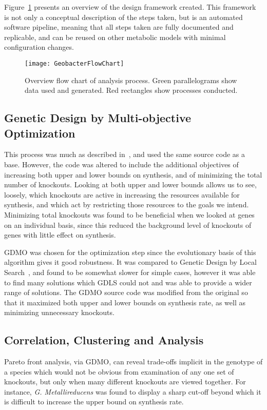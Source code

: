 \documentclass[a4paper]{article}
\begin{document}
Figure~\ref{fig:flowdiagram} presents an overview of the design framework created. This framework is not only a conceptual description of the steps taken, but is an automated software pipeline, meaning that all steps taken are fully documented and replicable, and can be reused on other metabolic models with minimal configuration changes. 

\begin{figure}[!htb]
\texttt{[image: GeobacterFlowChart]}
\caption{Overview flow chart of analysis process. Green parallelograms show data used and generated. Red rectangles show processes conducted.}
\label{fig:flowdiagram}
\end{figure}

\subsection{Genetic Design by Multi-objective Optimization}
This process was much as described in~\cite{Costanza2012}, and used the same source code as a base. However, the code was altered to include the additional objectives of increasing both upper and lower bounds on synthesis, and of minimizing the total number of knockouts. Looking at both upper and lower bounds allows us to see, loosely, which knockouts are active in increasing the resources available for synthesis, and which act by restricting those resources to the goals we intend. Minimizing total knockouts was found to be beneficial when we looked at genes on an individual basis, since this reduced the background level of knockouts of genes with little effect on synthesis.

GDMO was chosen for the optimization step since the evolutionary basis of this algorithm gives it good robustness. It was compared to Genetic Design by Local Search~\cite{Lun2009}, and found to be somewhat slower for simple cases, however it was able to find many solutions which GDLS could not and was able to provide a wider range of solutions. The GDMO source code was modified from the original so that it maximized both upper and lower bounds on synthesis rate, as well as minimizing unnecessary knockouts.

\subsection{Correlation, Clustering and Analysis}
Pareto front analysis, via GDMO, can reveal trade-offs implicit in the genotype of a species which would not be obvious from examination of any one set of knockouts, but only when many different knockouts are viewed together. For instance, {\it G. Metallireducens} was found to display a sharp cut-off beyond which it is difficult to increase the upper bound on synthesis rate.
\end{document}
